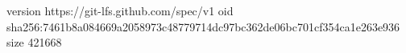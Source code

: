 version https://git-lfs.github.com/spec/v1
oid sha256:7461b8a084669a2058973c48779714dc97bc362de06bc701cf354ca1e263e936
size 421668
